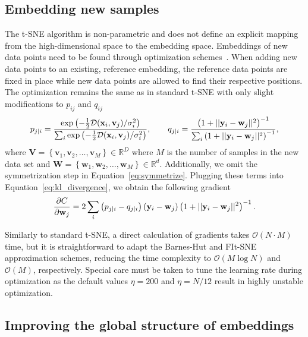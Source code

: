 \documentclass[article]{jss}
\begin{document}
\subsection{Embedding new samples} \label{sec:meth.transform}

The t-SNE algorithm is non-parametric and does not define an explicit mapping from the
high-dimensional space to the embedding space. Embeddings of new data
points need to be found through optimization
schemes~\citep{policar2021embedding}. When adding new data points to an
existing, reference embedding, the reference data points are fixed in place
while new data points are allowed to find their respective positions. The
optimization remains the same as in standard t-SNE with only slight
modifications to $p_{ij}$ and $q_{ij}$
\begin{align}
p_{j \mid i} = \frac{\exp \left ( -\frac{1}{2} \mathcal{D}(\mathbf{x}_i, \mathbf{v}_j) /  \sigma_i^2 \right )}{\sum_{i} \exp \left ( -\frac{1}{2} \mathcal{D}(\mathbf{x}_i, \mathbf{v}_j) / \sigma_i^2 \right )}, \qquad
q_{j \mid i} = \frac{\left ( 1 + || \mathbf{y}_i - \mathbf{w}_j ||^2 \right )^{-1}}{\sum_{i}\left ( 1 + || \mathbf{y}_i - \mathbf{w}_j ||^2 \right )^{-1}}, \notag
\end{align}
\noindent where $\mathbf{V} = \left \{ \mathbf{v}_1, \mathbf{v}_2, \dots,
\mathbf{v}_M \right \} \in \mathbb{R}^D$ where $M$ is the number of samples in
the new data set and $\mathbf{W} = \left \{ \mathbf{w}_1, \mathbf{w}_2, \dots,
\mathbf{w}_M \right \} \in \mathbb{R}^d$. Additionally, we omit the
symmetrization step in Equation~\ref{eq:symmetrize}. Plugging these terms into
Equation~\ref{eq:kl_divergence}, we obtain the following gradient
\begin{equation}
\frac{\partial C}{\partial \mathbf{w}_j} = 2 \sum_i \left ( p_{j \mid i} - q_{j \mid i} \right ) \left ( \mathbf{y}_i - \mathbf{w}_j \right ) \left ( 1 + || \mathbf{y}_i - \mathbf{w}_j || ^2 \right )^{-1}. \notag
\label{eq:gradient}
\end{equation}

Similarly to standard t-SNE, a direct calculation of gradients takes
$\mathcal{O}(N \cdot M)$ time, but it is straightforward to adapt the Barnes-Hut
and FIt-SNE approximation schemes, reducing the time complexity to
$\mathcal{O}(M \log N)$ and $\mathcal{O}(M)$, respectively. Special care must be
taken to tune the learning rate during optimization as the default values
$\eta=200$ and $\eta=N/12$ result in highly unstable optimization.


\subsection{Improving the global structure of embeddings} \label{sec:meth.global}
\end{document}
